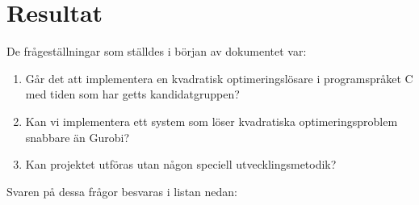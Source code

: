 \section{Resultat}

De frågeställningar som ställdes i början av dokumentet var:
\begin{enumerate}
\item Går det att implementera en kvadratisk optimeringslösare i programspråket C med tiden som har getts kandidatgruppen?
\item Kan vi implementera ett system som löser kvadratiska optimeringsproblem snabbare än Gurobi?
\item Kan projektet utföras utan någon speciell utvecklingsmetodik? 
\end{enumerate}

Svaren på dessa frågor besvaras i listan nedan:
